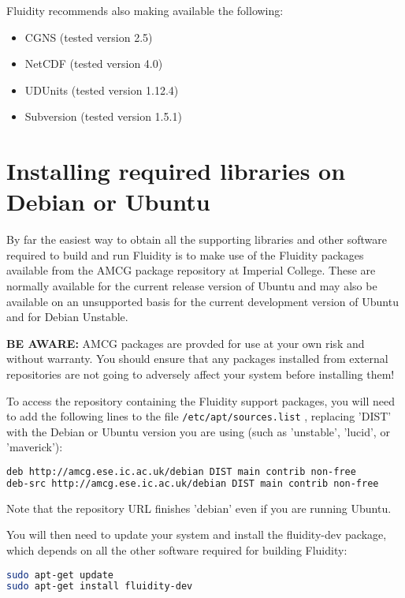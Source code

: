 Fluidity recommends also making available the following:

\begin{itemize}
\item CGNS (tested version 2.5)
\item NetCDF (tested version 4.0)
\item UDUnits (tested version 1.12.4)
\item Subversion (tested version 1.5.1)
\end{itemize}

\section{Installing required libraries on Debian or Ubuntu}
\label{sec:required_ḻibraries_debian}

By far the easiest way to obtain all the supporting libraries and other
software required to build and run Fluidity is to make use of the Fluidity
packages available from the AMCG package repository at Imperial College.  These
are normally available for the current release version of Ubuntu and may also
be available on an unsupported basis for the current development version of
Ubuntu and for Debian Unstable.

\textbf{BE AWARE:} AMCG packages are provded for use at your own risk and
without warranty. You should ensure that any packages installed from external
repositories are not going to adversely affect your system before installing
them!

To access the repository containing the Fluidity support packages, you will
need to add the following lines to the file
\lstinline[language=bash]+/etc/apt/sources.list+ , replacing 'DIST' with
the Debian or Ubuntu version you are using (such as 'unstable', 'lucid', or
'maverick'):

\begin{lstlisting}[language=bash]
deb http://amcg.ese.ic.ac.uk/debian DIST main contrib non-free
deb-src http://amcg.ese.ic.ac.uk/debian DIST main contrib non-free
\end{lstlisting}

Note that the repository URL finishes 'debian' even if you are running Ubuntu.

You will then need to update your system and install the fluidity-dev package,
which depends on all the other software required for building Fluidity:

\begin{lstlisting}[language=bash]
sudo apt-get update
sudo apt-get install fluidity-dev
\end{lstlisting}

